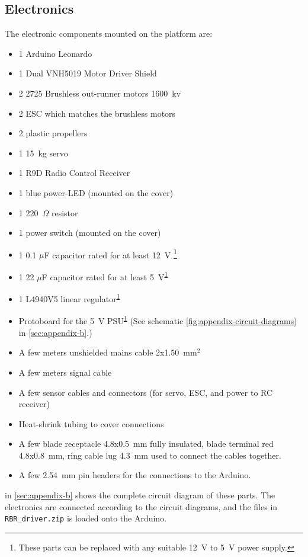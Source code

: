 \subsection{Electronics}
The electronic components mounted on the platform are:
\begin{itemize}
  \item 1 Arduino Leonardo
  \item 1 Dual VNH5019 Motor Driver Shield
  \item 2 2725 Brushless out-runner motors 1600~kv
  \item 2 ESC which matches the brushless motors
  \item 2 plastic propellers
  \item 1 15~kg servo
  \item 1 R9D Radio Control Receiver
  \item 1 blue power-LED (mounted on the cover)
  \item 1 220~$\Omega$ resistor
  \item 1 power switch (mounted on the cover)
  \item 1 0.1 $\mu$F capacitor rated for at least 12~V \footnote{\label{fotnot_app} These parts can be replaced with any suitable 12~V to 5~V power supply.}
  \item 1 22 $\mu$F capacitor rated for at least 5~V\textsuperscript{\ref{fotnot_app}}
  \item 1 L4940V5 linear regulator\textsuperscript{\ref{fotnot_app}}
  \item Protoboard for the 5~V PSU\textsuperscript{\ref{fotnot_app}} (See schematic \cref{fig:appendix-circuit-diagrams} in \cref{sec:appendix-b}.)
  \item A few meters unshielded mains cable 2x1.50~mm$^2$
  \item A few meters signal cable
  \item A few sensor cables and connectors (for servo, ESC, and power to RC receiver)
  \item Heat-shrink tubing to cover connections
  \item A few blade receptacle 4.8x0.5~mm fully insulated, blade terminal red
    4.8x0.8~mm, ring cable lug 4.3~mm used to connect the cables together.
  \item A few 2.54~mm pin headers for the connections to the Arduino.
\end{itemize}
  in \cref{sec:appendix-b} shows the complete circuit diagram of these parts. The electronics are connected according to the circuit diagrams, and the files in \texttt{RBR\_driver.zip} is loaded onto the Arduino.

